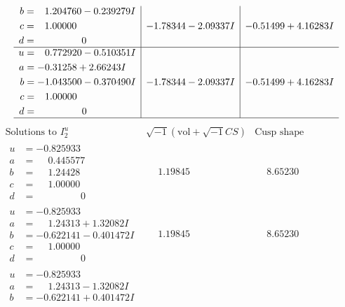 \documentclass[1p]{elsarticle_modified}
\theoremstyle{definition}
\newcommand{\I}{\sqrt{-1}}
\begin{document}
$$\begin{array}{c|c|c}
\begin{aligned}
b &= \phantom{-}1.204760 - 0.239279 I \\
c &= \phantom{-}1.00000\phantom{ +0.000000I} \\
d &= \phantom{-0.000000 } 0\end{aligned}
 & -1.78344 - 2.09337 I & -0.51499 + 4.16283 I \\ \hline\begin{aligned}
u &= \phantom{-}0.772920 - 0.510351 I \\
a &= -0.31258 + 2.66243 I \\
b &= -1.043500 - 0.370490 I \\
c &= \phantom{-}1.00000\phantom{ +0.000000I} \\
d &= \phantom{-0.000000 } 0\end{aligned}
 & -1.78344 - 2.09337 I & -0.51499 + 4.16283 I\\
 \hline 
 \end{array}$$\newpage$$\begin{array}{c|c|c}  
\text{Solutions to }I^u_{2}& \I (\text{vol} + \sqrt{-1}CS) & \text{Cusp shape}\\
 \hline 
\begin{aligned}
u &= -0.825933\phantom{ +0.000000I} \\
a &= \phantom{-}0.445577\phantom{ +0.000000I} \\
b &= \phantom{-}1.24428\phantom{ +0.000000I} \\
c &= \phantom{-}1.00000\phantom{ +0.000000I} \\
d &= \phantom{-0.000000 } 0\end{aligned}
 & \phantom{-}1.19845\phantom{ +0.000000I} & \phantom{-}8.65230\phantom{ +0.000000I} \\ \hline\begin{aligned}
u &= -0.825933\phantom{ +0.000000I} \\
a &= \phantom{-}1.24313 + 1.32082 I \\
b &= -0.622141 - 0.401472 I \\
c &= \phantom{-}1.00000\phantom{ +0.000000I} \\
d &= \phantom{-0.000000 } 0\end{aligned}
 & \phantom{-}1.19845\phantom{ +0.000000I} & \phantom{-}8.65230\phantom{ +0.000000I} \\ \hline\begin{aligned}
u &= -0.825933\phantom{ +0.000000I} \\
a &= \phantom{-}1.24313 - 1.32082 I \\
b &= -0.622141 + 0.401472 I \\

\end{aligned}
\end{array}$$
\end{document}
